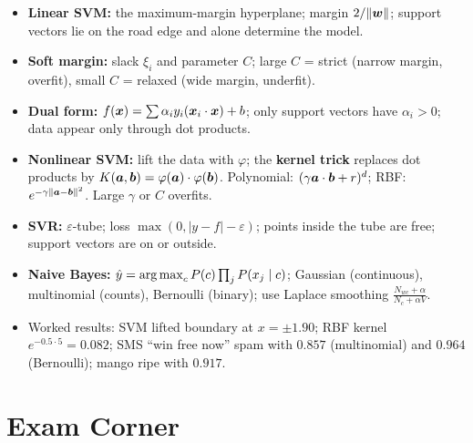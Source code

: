 \begin{summary}
\begin{itemize}
  \item \textbf{Linear SVM:} the maximum-margin hyperplane; margin $2/\|\boldsymbol{w}\|$; support vectors lie on the road edge and alone determine the model.
  \item \textbf{Soft margin:} slack $\xi_i$ and parameter $C$; large $C$ = strict (narrow margin, overfit), small $C$ = relaxed (wide margin, underfit).
  \item \textbf{Dual form:} $f(\boldsymbol{x})=\sum\alpha_iy_i(\boldsymbol{x}_i\cdot\boldsymbol{x})+b$; only support vectors have $\alpha_i>0$; data appear only through dot products.
  \item \textbf{Nonlinear SVM:} lift the data with $\varphi$; the \textbf{kernel trick} replaces dot products by $K(\boldsymbol{a},\boldsymbol{b})=\varphi(\boldsymbol{a})\cdot\varphi(\boldsymbol{b})$. Polynomial: $(\gamma\boldsymbol{a}\cdot\boldsymbol{b}+r)^d$; RBF: $e^{-\gamma\|\boldsymbol{a}-\boldsymbol{b}\|^2}$. Large $\gamma$ or $C$ overfits.
  \item \textbf{SVR:} $\varepsilon$-tube; loss $\max(0,|y-f|-\varepsilon)$; points inside the tube are free; support vectors are on or outside.
  \item \textbf{Naive Bayes:} $\hat y=\operatorname*{arg\,max}_cP(c)\prod_jP(x_j\mid c)$; Gaussian (continuous), multinomial (counts), Bernoulli (binary); use Laplace smoothing $\frac{N_{wc}+\alpha}{N_c+\alpha V}$.
  \item Worked results: SVM lifted boundary at $x=\pm1.90$; RBF kernel $e^{-0.5\cdot5}=0.082$; SMS ``win free now'' spam with $0.857$ (multinomial) and $0.964$ (Bernoulli); mango ripe with $0.917$.
\end{itemize}
\end{summary}

\section*{Exam Corner}


